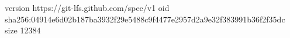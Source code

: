 version https://git-lfs.github.com/spec/v1
oid sha256:04914e6d02b187ba3932f29e5488c9f4477e2957d2a9e32f383991b36f2f35dc
size 12384
